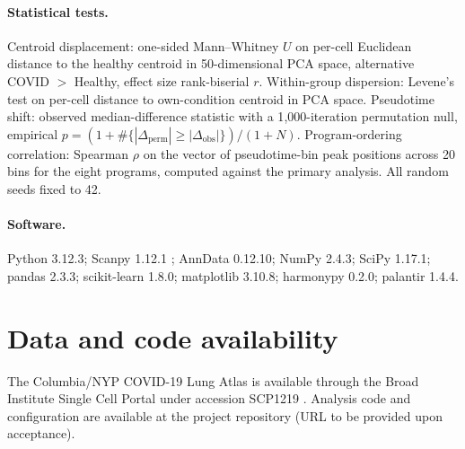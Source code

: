 \documentclass[11pt]{article}
\begin{document}
\paragraph{Statistical tests.} Centroid displacement: one-sided Mann--Whitney $U$ on per-cell Euclidean distance to the healthy centroid in 50-dimensional PCA space, alternative COVID $>$ Healthy, effect size rank-biserial $r$. Within-group dispersion: Levene's test on per-cell distance to own-condition centroid in PCA space. Pseudotime shift: observed median-difference statistic with a 1{,}000-iteration permutation null, empirical $p = (1 + \#\{|\Delta_{\text{perm}}| \geq |\Delta_{\text{obs}}|\}) / (1 + N)$. Program-ordering correlation: Spearman $\rho$ on the vector of pseudotime-bin peak positions across 20 bins for the eight programs, computed against the primary analysis. All random seeds fixed to 42.

\paragraph{Software.} Python 3.12.3; Scanpy 1.12.1 \citep{Wolf2018}; AnnData 0.12.10; NumPy 2.4.3; SciPy 1.17.1; pandas 2.3.3; scikit-learn 1.8.0; matplotlib 3.10.8; harmonypy 0.2.0; palantir 1.4.4.

\section*{Data and code availability}

The Columbia/NYP COVID-19 Lung Atlas is available through the Broad Institute Single Cell Portal under accession SCP1219 \citep{Melms2021}. Analysis code and configuration are available at the project repository (URL to be provided upon acceptance).
\end{document}
